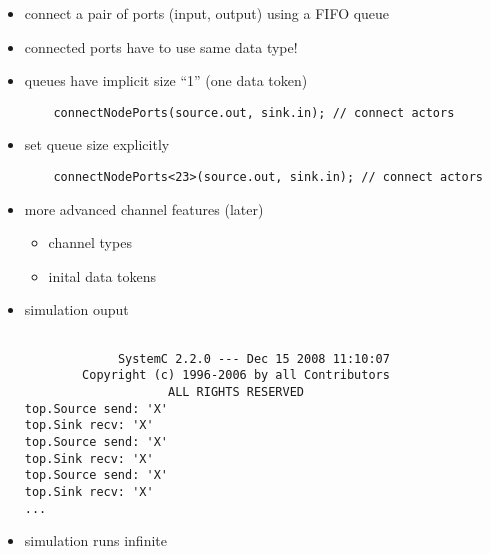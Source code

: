 \begin{frame}[fragile=singleslide]
\begin{itemize}
\item connect a pair of ports (input, output) using a FIFO queue
\item connected ports have to use same data type!
\item queues have implicit size ``1'' (one data token)
\begin{lstlisting}
    connectNodePorts(source.out, sink.in); // connect actors
\end{lstlisting}
\item set queue size explicitly
\begin{lstlisting}
    connectNodePorts<23>(source.out, sink.in); // connect actors
\end{lstlisting}
\item more advanced channel features (later)
\begin{itemize}
\item channel types
\item inital data tokens
\end{itemize}
\end{itemize}
\end{frame}




\begin{frame}[fragile=singleslide]
\begin{itemize}
\item simulation ouput
\begin{lstlisting}

             SystemC 2.2.0 --- Dec 15 2008 11:10:07
        Copyright (c) 1996-2006 by all Contributors
                    ALL RIGHTS RESERVED
top.Source send: 'X'
top.Sink recv: 'X'
top.Source send: 'X'
top.Sink recv: 'X'
top.Source send: 'X'
top.Sink recv: 'X'
...
\end{lstlisting}
\item simulation runs infinite
\end{itemize}
\end{frame}





